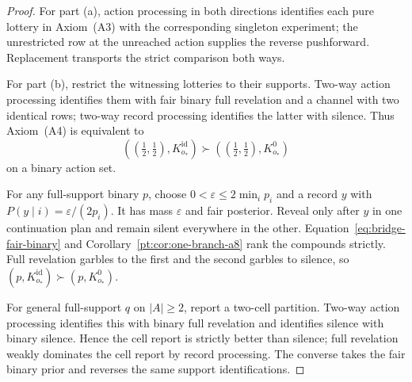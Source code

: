\begin{proof}
For part \textup{(a)}, action processing in both directions identifies each
pure lottery in Axiom~\textup{(A3)} with the corresponding singleton
experiment; the unrestricted row at the unreached action supplies the reverse
pushforward.  Replacement transports the strict comparison both ways.

For part \textup{(b)}, restrict the witnessing lotteries to their supports.
Two-way action processing identifies them with fair binary full revelation
and a channel with two identical rows; two-way record processing identifies
the latter with silence.  Thus Axiom~\textup{(A4)} is equivalent to
\begin{equation}
  ((\tfrac12,\tfrac12),K^{\mathrm{id}}_{o_\ast})
  \succ
  ((\tfrac12,\tfrac12),K^0_{o_\ast})
  \label{eq:bridge-fair-binary}
\end{equation}
on a binary action set.

For any full-support binary $p$, choose
$0<\varepsilon\le2\min_i p_i$ and a record $y$ with
$P(y\mid i)=\varepsilon/(2p_i)$.  It has mass $\varepsilon$ and fair
posterior.  Reveal only after $y$ in one continuation plan and remain silent
everywhere in the other.  Equation~\eqref{eq:bridge-fair-binary} and
Corollary~\ref{pt:cor:one-branch-a8} rank the compounds strictly.  Full
revelation garbles to the first and the second garbles to silence, so
$(p,K^{\mathrm{id}}_{o_\ast})\succ(p,K^0_{o_\ast})$.

For general full-support $q$ on $|A|\ge2$, report a two-cell partition.
Two-way action processing identifies this with binary full revelation and
identifies silence with binary silence.  Hence the cell report is strictly
better than silence; full revelation weakly dominates the cell report by
record processing.  The converse takes the fair binary prior and reverses
the same support identifications.
\end{proof}
